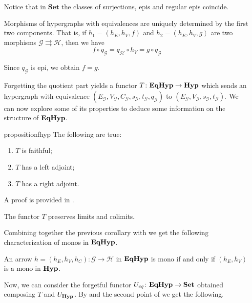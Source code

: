 \documentclass[a4paper,UKenglish,cleveref,pdftex,thm-restate,numberwithinsect]{lipics-v2021}
\newcommand{\eq}{\mathsf{eq}}
\newcommand{\Set}{\mathbf{Set}}
\newcommand{\catname}[1]{\textbf{\textup{#1}}}
\newcommand{\hyp}{\catname{Hyp}}
\newcommand{\EqHyp}{\catname{EqHyp}} %
\begin{document}
\begin{remark}
	Notice that in $\Set$ the classes of surjections, epis and regular epis coincide.
\end{remark}

\begin{remark}\label{rem:eqhyp_morphs}
	Morphisms of hypergraphs with equivalences are uniquely determined by the first two components. That is, if $h_1 = (h_E, h_V, f)$ and $h_2 = (h_E, h_V, g)$ are two morphisms $\mathcal{G} \rightrightarrows \mathcal{H}$, then we have
	\[f \circ q_\mathcal{G} = q_\mathcal{H}\circ h_V =g\circ q_\mathcal{G}\]
	
	Since $q_\mathcal{G}$ is epi, we obtain $f = g$.
\end{remark}

Forgetting the quotient part yields a functor $T\colon \EqHyp \to \hyp$ which sends an hypergraph with equivalence $(E_\mathcal{G}, V_{\mathcal{G}}, C_\mathcal{G}, s_\mathcal{G}, t_\mathcal{G}, q_\mathcal{G})$ to $(E_{\mathcal{G}}, V_{\mathcal{G}}, s_\mathcal{G}, t_{\mathcal{G}})$.   We can now explore some of its properties to deduce some information on the structure of $\EqHyp$.  

\begin{restatable}{proposition}{fhyp}\label{prop:forghyp}  The following are true:
	\begin{enumerate}
		\item$T$ is faithful;
		\item $T$ has a left adjoint;
		\item $T$ has a right adjoint.
	\end{enumerate}
\end{restatable}
A proof is provided in .


\begin{corollary}\label{cor:limcolim}
	The functor $T$ preserves limits and colimits.
\end{corollary}

Combining together the previous corollary with  we get the following characterization of monos in $\EqHyp$.

\begin{corollary}\label{cor:mono1}
	An arrow $h = (h_E, h_V, h_C): \mathcal{G \to H}$ in $\EqHyp$ is mono if and only if $(h_E, h_V)$ is a mono in $\hyp$.
\end{corollary}

Now, we can consider the forgetful functor $U_{\eq}\colon \EqHyp\to \Set$ obtained composing $T$ and $U_{\hyp}$.  By  and the second point of  we get the following.
\end{document}
